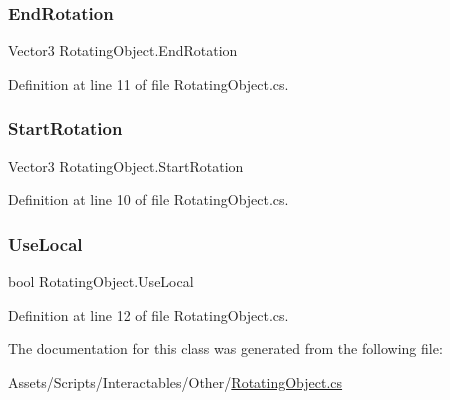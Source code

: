 \subsubsection{\texorpdfstring{End\+Rotation}{EndRotation}}
{\footnotesize\ttfamily Vector3 Rotating\+Object.\+End\+Rotation}



Definition at line 11 of file Rotating\+Object.\+cs.

\mbox{\label{class_rotating_object_a4e222e799b7677eddc0a918a058e2fd2}} 
\subsubsection{\texorpdfstring{Start\+Rotation}{StartRotation}}
{\footnotesize\ttfamily Vector3 Rotating\+Object.\+Start\+Rotation}



Definition at line 10 of file Rotating\+Object.\+cs.

\mbox{\label{class_rotating_object_a4416e2ce945d946eccb9f10b5129c3e6}} 
\subsubsection{\texorpdfstring{Use\+Local}{UseLocal}}
{\footnotesize\ttfamily bool Rotating\+Object.\+Use\+Local}



Definition at line 12 of file Rotating\+Object.\+cs.



The documentation for this class was generated from the following file\+:\begin{DoxyCompactItemize}
\item 
Assets/\+Scripts/\+Interactables/\+Other/\mbox{\hyperlink{_rotating_object_8cs}{Rotating\+Object.\+cs}}\end{DoxyCompactItemize}
